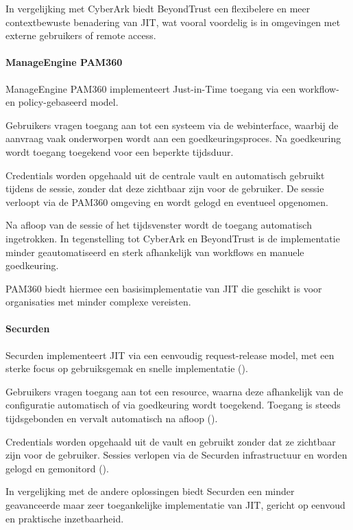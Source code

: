 In vergelijking met CyberArk biedt BeyondTrust een flexibelere en meer contextbewuste benadering van JIT, wat vooral voordelig is in omgevingen met externe gebruikers of remote access.

\paragraph{ManageEngine PAM360}
ManageEngine PAM360 implementeert Just-in-Time toegang via een workflow- en policy-gebaseerd model.

Gebruikers vragen toegang aan tot een systeem via de webinterface, waarbij de aanvraag vaak onderworpen wordt aan een goedkeuringsproces. Na goedkeuring wordt toegang toegekend voor een beperkte tijdsduur.

Credentials worden opgehaald uit de centrale vault en automatisch gebruikt tijdens de sessie, zonder dat deze zichtbaar zijn voor de gebruiker. De sessie verloopt via de PAM360 omgeving en wordt gelogd en eventueel opgenomen.

Na afloop van de sessie of het tijdsvenster wordt de toegang automatisch ingetrokken. In tegenstelling tot CyberArk en BeyondTrust is de implementatie minder geautomatiseerd en sterk afhankelijk van workflows en manuele goedkeuring.

PAM360 biedt hiermee een basisimplementatie van JIT die geschikt is voor organisaties met minder complexe vereisten.

\paragraph{Securden}
Securden implementeert JIT via een eenvoudig request-release model, met een sterke focus op gebruiksgemak en snelle implementatie (\cite{securden_pam}).

Gebruikers vragen toegang aan tot een resource, waarna deze afhankelijk van de configuratie automatisch of via goedkeuring wordt toegekend. Toegang is steeds tijdsgebonden en vervalt automatisch na afloop (\cite{securden_pam,nist2020}).

Credentials worden opgehaald uit de vault en gebruikt zonder dat ze zichtbaar zijn voor de gebruiker. Sessies verlopen via de Securden infrastructuur en worden gelogd en gemonitord (\cite{securden_session_monitoring,securden_pam}).

In vergelijking met de andere oplossingen biedt Securden een minder geavanceerde maar zeer toegankelijke implementatie van JIT, gericht op eenvoud en praktische inzetbaarheid.


